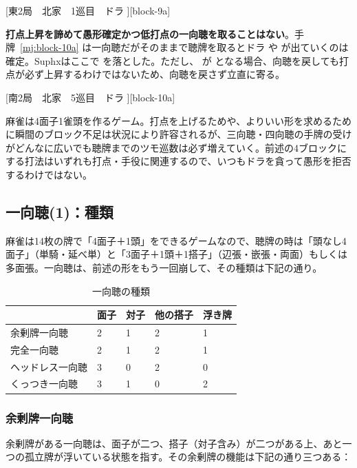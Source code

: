 \documentclass[../nankiru_main.tex]{subfiles}
\begin{document}
[東2局　北家　1巡目　ドラ ][block-9a]

\textbf{打点上昇を諦めて愚形確定かつ低打点の一向聴を取ることはない}\citep[][pp.~160--161]{suphx}。手牌~\ref{mj:block-10a} は一向聴だがそのままで聴牌を取るとドラ  や  が出ていくのは確定。Suphxはここで  を落とした。ただし、 が  となる場合、向聴を戻しても打点が必ず上昇するわけではないため、向聴を戻さず立直に寄る。

[南2局　北家　5巡目　ドラ ][block-10a]

麻雀は4面子1雀頭を作るゲーム。打点を上げるためや、よりいい形を求めるために瞬間のブロック不足は状況により許容されるが、三向聴・四向聴の手牌の受けがどんなに広いでも聴牌までのツモ巡数は必ず増えていく。前述の4ブロックにする打法はいずれも打点・手役に関連するので、いつもドラを貪って愚形を拒否するわけではない。

\subsection{一向聴(1)：種類}

麻雀は14枚の牌で「4面子＋1頭」をできるゲームなので、聴牌の時は「頭なし4面子」（単騎・延べ単）と「3面子＋1頭＋1搭子」（辺張・嵌張・両面）もしくは多面張。一向聴は、前述の形をもう一回崩して、その種類は下記の通り\citep{tomo-iishanten}。

\begin{table}[ht]
  \centering
  \begin{tabular}{lllll}
    & 面子 & 対子 & 他の搭子 & 浮き牌 \\
    \hline
    余剰牌一向聴 & 2 & 1 & 2 & 1 \\
    完全一向聴 & 2 & 1 & 2 & 1 \\
    ヘッドレス一向聴 & 3 & 0 & 2 & 0 \\
    くっつき一向聴 & 3 & 1 & 0 & 2
  \end{tabular}
  \caption{一向聴の種類}
\end{table}


\subsubsection*{余剰牌一向聴}

余剰牌がある一向聴は、面子が二つ、搭子（対子含み）が二つがある上、あと一つの孤立牌が浮いている状態を指す。その余剰牌の機能は下記の通り三つある：
\end{document}
